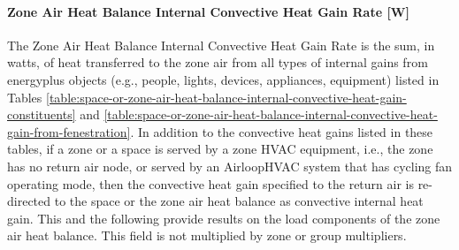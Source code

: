 \paragraph{Zone Air Heat Balance Internal Convective Heat Gain Rate {[}W{]}}\label{zone-air-heat-balance-internal-convective-heat-gain-rate-w}

The Zone Air Heat Balance Internal Convective Heat Gain Rate is the sum, in watts, of heat transferred to the zone air from all types of internal gains from energyplus objects (e.g., people, lights, devices, appliances, equipment) listed in Tables \ref{table:space-or-zone-air-heat-balance-internal-convective-heat-gain-constituents} and \ref{table:space-or-zone-air-heat-balance-internal-convective-heat-gain-from-fenestration}. In addition to the convective heat gains listed in these tables, if a zone or a space is served by a zone HVAC equipment, i.e., the zone has no return air node, or served by an AirloopHVAC system that has cycling fan operating mode, then the convective heat gain specified to the return air is re-directed to the space or the zone air heat balance as convective internal heat gain. This and the following provide results on the load components of the zone air heat balance. This field is not multiplied by zone or group multipliers.

